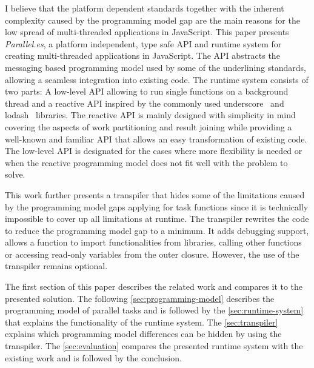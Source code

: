 I believe that the platform dependent standards together with the inherent complexity caused by the programming model gap are the main reasons for the low spread of multi-threaded applications in JavaScript. This paper presents \textit{Parallel.es}, a platform independent, type safe API and runtime system for creating multi-threaded applications in JavaScript. The API abstracts the messaging based programming model used by some of the underlining standards, allowing a seamless integration into existing code. The runtime system consists of two parts: A low-level API allowing to run single functions on a background thread and a reactive API inspired by the commonly used underscore~\cite{underscorejs} and lodash~\cite{lodash} libraries. The reactive API is mainly designed with simplicity in mind covering the aspects of work partitioning and result joining while providing a well-known and familiar API that allows an easy transformation of existing code. The low-level API is designated for the cases where more flexibility is needed or when the reactive programming model does not fit well with the problem to solve. 

This work further presents a transpiler that hides some of the limitations caused by the programming model gaps applying for task functions since it is technically impossible to cover up all limitations at runtime. The transpiler rewrites the code to reduce the programming model gap to a minimum. It adds debugging support, allows a function to import functionalities from libraries, calling other functions or accessing read-only variables from the outer closure. However, the use of the transpiler remains optional. 


The first section of this paper describes the related work and compares it to the presented solution. The following \cref{sec:programming-model} describes the programming model of parallel tasks and is followed by the \cref{sec:runtime-system} that explains the functionality of the runtime system. The \cref{sec:transpiler} explains which programming model differences can be hidden by using the transpiler. The \cref{sec:evaluation} compares the presented runtime system with the existing work and is followed by the conclusion. 